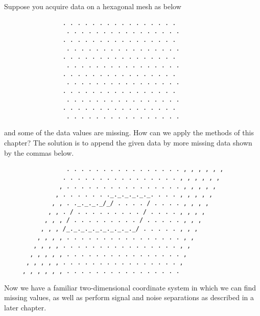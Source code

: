 \par
Suppose you acquire data on a hexagonal mesh as below
\par\noindent
\scriptsize
\begin{verbatim}
                . . . . . . . . . . . . . . . .
                 . . . . . . . . . . . . . . . .
                . . . . . . . . . . . . . . . .
                 . . . . . . . . . . . . . . . .
                . . . . . . . . . . . . . . . .
                 . . . . . . . . . . . . . . . .
                . . . . . . . . . . . . . . . .
                 . . . . . . . . . . . . . . . .
                . . . . . . . . . . . . . . . .
                 . . . . . . . . . . . . . . . .
                . . . . . . . . . . . . . . . .
                 . . . . . . . . . . . . . . . .
\end{verbatim}
\normalsize
\par\noindent
and some of the data values are missing.
How can we apply the methods of this chapter?
The solution is to append the given data by more missing data
shown by the commas below.
\par\noindent
\scriptsize
\begin{verbatim}
                 . . . . . . . . . . . . . . . . , , , , , ,
                . . . . . . . . . . . . . . . . , , , , , ,
               , . . . . . . . . . . . . . . . . , , , , ,
              , . . . . . . ._._._._._._. . . . , , , , ,
             , , . ._._._._/_/ . . . . / . . . . , , , ,
            , , . / . . . . . . . . . / . . . . , , , ,
           , , , / . . . . . . . . . / . . . . . , , ,
          , , , /_._._._._._._._._._/ . . . . . , , ,
         , , , , . . . . . . . . . . . . . . . . , ,
        , , , , . . . . . . . . . . . . . . . . , ,
       , , , , , . . . . . . . . . . . . . . . . ,
      , , , , , . . . . . . . . . . . . . . . . ,
     , , , , , , . . . . . . . . . . . . . . . . 
\end{verbatim}
\normalsize
\par\noindent
Now we have a familiar two-dimensional coordinate system
in which we can find missing values,
as well as perform signal and noise separations
as described in a later chapter.



